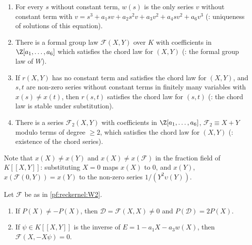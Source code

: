 \begin{enumerate}[label=(W\arabic*)]
\item\label{pf:reckernel:W1} For every $s$ without constant term, $w(s)$ is the only series $v$ without constant term
  with $v=s^3+a_1sv+a_2s^2v+a_3v^2+a_4sv^2+a_6v^3$ (: uniqueness of solutions of
  this equation).
\item\label{pf:reckernel:W2} There is a formal group law $\mathcal F(X,Y)$ over $K$ with coefficients in
  $\Z[a_1,\dots,a_6]$ which satisfies the chord law for $(X,Y)$ (: the formal
  group law of $W$).
\item\label{pf:reckernel:W3} If $r(X,Y)$ has no constant term and satisfies the chord law for $(X,Y)$, and $s,t$ are
  non-zero series without constant terms in finitely many variables with $x(s)\ne x(t)$, then $r(s,t)$ satisfies the chord
  law for $(s,t)$ (: the chord law is stable under substitution).
\item\label{pf:reckernel:W4} There is a series $\mathcal F_2(X,Y)$ with coefficients in $\Z[a_1,\dots,a_6]$,
  $\mathcal F_2\equiv X+Y$ modulo terms of degree $\ge2$, which satisfies the chord law for $(X,Y)$
  (: existence of the chord series).
\end{enumerate}
Note that $x(X)\ne x(Y)$ and $x(X)\ne x(\mathcal F)$ in the fraction field of $K[[X,Y]]$: substituting $X=0$ maps
$x(X)$ to $0$, and $x(Y)$, $x(\mathcal F(0,Y))=x(Y)$ to the non-zero series $1/(Y^2\upsilon(Y))$.

\begin{lemma}\label{pf:reckernel:fglDblInv}
Let $\mathcal F$ be as in \ref{pf:reckernel:W2}.
\begin{enumerate}
\item If $P(X)\ne-P(X)$, then $\mathcal D=\mathcal F(X,X)\ne0$ and $P(\mathcal D)=2P(X)$.
\item If $\psi\in K[[X,Y]]$ is the inverse of $E=1-a_1X-a_3w(X)$, then $\mathcal F(X,-X\psi)=0$.
\end{enumerate}
\end{lemma}


